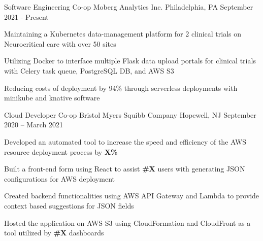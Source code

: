 

\begin{cventries}

  
	\cventry
	{Software Engineering Co-op}
	{Moberg Analytics Inc.}
	{Philadelphia, PA}
	{September 2021 - Present}
	{\begin{cvitems}
		\item {Maintaining a Kubernetes data-management platform for 2 clinical trials on Neurocritical care with over 50 sites}
		\item {Utilizing Docker to interface multiple Flask data upload portals for clinical trials with Celery task queue, PostgreSQL DB, and AWS S3}
		\item {Reducing costs of deployment by 94\% through serverless deployments with minikube and knative software}
		\end{cvitems}}
	

	\vspace{-2mm}
	\cventry
	{Cloud Developer Co-op}
	{Bristol Myers Squibb Company}
	{Hopewell, NJ}
	{September 2020 – March 2021}
	{\begin{cvitems}
		\item {Developed an automated tool to increase the speed and efficiency of the AWS resource deployment process by \textbf{X\%} }
        \item {Built a front-end form using React to assist \textbf{\#X} users with generating JSON configurations for AWS deployment}
        \item {Created backend functionalities using AWS API Gateway and Lambda to provide context based suggestions for JSON fields}
        \item {Hosted the application on AWS S3 using CloudFormation and CloudFront as a tool utilized by \textbf{\#X} dashboards}
		\end{cvitems}}
	

\end{cventries}
